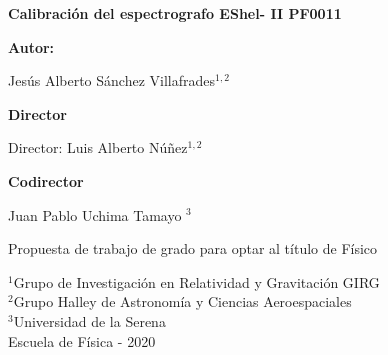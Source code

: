 \documentclass[a4paper,12pt,twoside]{report}
\title{}
\begin{document}
\begin{center}
\thispagestyle{empty}
\fontsize{12pt}{12pt}\selectfont 



\textbf {\huge Calibración del espectrografo EShel- II PF0011}

\vspace{3cm}


{\large \textbf{Autor:}}

\vspace{0.5cm}

\large Jesús Alberto Sánchez Villafrades$^{1,2}$

\vspace{3cm}

{\large \textbf{Director}}\\

\vspace{0.5cm}

{\large Director: Luis Alberto Núñez$^{1,2}$}\\

\vspace{0.5cm}

{\large \textbf{Codirector}}\\

\vspace{0.5cm}

{\large Juan Pablo Uchima Tamayo $^{3}$}

\vspace{3cm}

\normalsize

\large Propuesta de trabajo de grado para optar al t\'itulo de F\'isico


\vspace{4cm}



\large $^1$Grupo de Investigaci\'on en Relatividad y Gravitaci\'on GIRG \\
\large  $^2$Grupo Halley de Astronom\'ia y Ciencias Aeroespaciales \\
\large  $^3$Universidad de la Serena \\
\large  Escuela de Física - 2020
  \end{center}
  
\newpage

\newpage

\setcounter{page}{2}
%
%
%
%
\end{document}

